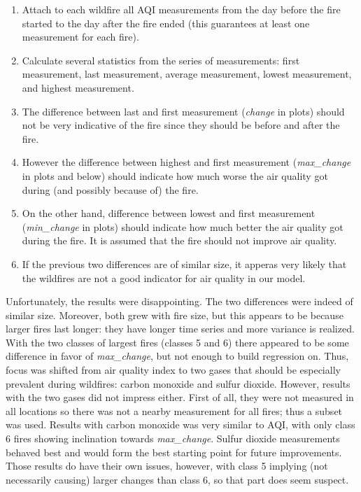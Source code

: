 \documentclass[a4paper,12pt]{article}
\begin{document}
\begin{enumerate}[itemsep=-0.5ex]
	\item Attach to each wildfire all AQI measurements from the day before the fire started to the day after the fire ended (this guarantees at least one measurement for each fire).
	\item Calculate several statistics from the series of measurements: first measurement, last measurement, average measurement, lowest measurement, and highest measurement.
	\item The difference between last and first measurement (\emph{change} in plots) should not be very indicative of the fire since they should be before and after the fire.
	\item However the difference between highest and first measurement (\emph{max\_change} in plots and below) should indicate how much worse the air quality got during (and possibly because of) the fire.
	\item On the other hand, difference between lowest and first measurement (\emph{min\_change} in plots) should indicate how much better the air quality got during the fire. It is assumed that the fire should not improve air quality.
	\item If the previous two differences are of similar size, it apperas very likely that the wildfires are not a good indicator for air quality in our model.
\end{enumerate}

Unfortunately, the results were disappointing. The two differences were indeed of similar size. Moreover, both grew with fire size, but this appears to be because larger fires last longer: they have longer time series and more variance is realized. With the two classes of largest fires (classes 5 and 6) there appeared to be some difference in favor of \emph{max\_change}, but not enough to build regression on. Thus, focus was shifted from air quality index to two gases that should be especially prevalent during wildfires: carbon monoxide and sulfur dioxide. However, results with the two gases did not impress either. First of all, they were not measured in all locations so there was not a nearby measurement for all fires; thus a subset was used. Results with carbon monoxide was very similar to AQI, with only class 6 fires showing inclination towards \emph{max\_change}. Sulfur dioxide measurements behaved best and would form the best starting point for future improvements. Those results do have their own issues, however, with class 5 implying (not necessarily causing) larger changes than class 6, so that part does seem suspect.
\end{document}

